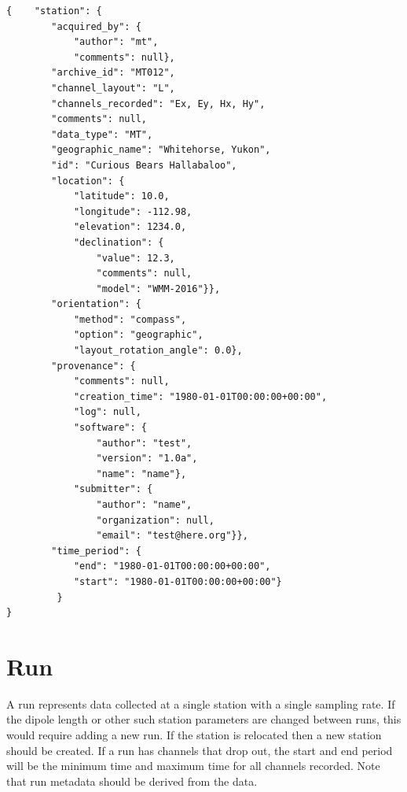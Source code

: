 \documentclass[12pt]{article}
\begin{document}
\begin{verbatim}
{    "station": {
        "acquired_by": {
            "author": "mt",
            "comments": null},
        "archive_id": "MT012",
        "channel_layout": "L",
        "channels_recorded": "Ex, Ey, Hx, Hy",
        "comments": null,
        "data_type": "MT",
        "geographic_name": "Whitehorse, Yukon",
        "id": "Curious Bears Hallabaloo",
        "location": {
            "latitude": 10.0,
            "longitude": -112.98,
            "elevation": 1234.0,
            "declination": {
                "value": 12.3,
                "comments": null,
                "model": "WMM-2016"}},
        "orientation": {
            "method": "compass",
            "option": "geographic",
            "layout_rotation_angle": 0.0},
        "provenance": {
            "comments": null,
            "creation_time": "1980-01-01T00:00:00+00:00",
            "log": null,
            "software": {
                "author": "test",
                "version": "1.0a",
                "name": "name"},
            "submitter": {
                "author": "name",
                "organization": null,
                "email": "test@here.org"}},
        "time_period": {
            "end": "1980-01-01T00:00:00+00:00",
            "start": "1980-01-01T00:00:00+00:00"}
         }
}
\end{verbatim}

\newpage
\section{Run}

A run represents data collected at a single station with a single sampling rate. If the dipole length or other such station parameters are changed between runs, this would require adding a new run.  If the station is relocated then a new station should be created.  If a run has channels that drop out, the start and end period will be the minimum time and maximum time for all channels recorded. Note that run metadata should be derived from the data.  
\end{document}
